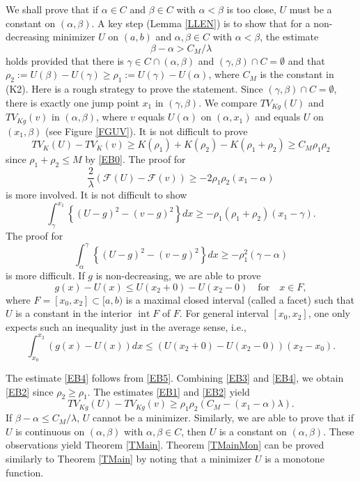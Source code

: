 \documentclass[11pt]{amsart} %
\numberwithin{equation}{section}
\begin{document}
We shall prove that if $\alpha\in C$ and $\beta\in C$ with $\alpha<\beta$ is too close, $U$ must be a constant on $(\alpha,\beta)$.
 A key step (Lemma \ref{LLEN}) is to show that for a non-decreasing minimizer $U$ on $(a,b)$ and $\alpha,\beta\in C$ with $\alpha<\beta$, the estimate
\[
	\beta - \alpha > C_M/\lambda
\]
holds provided that there is $\gamma\in C\cap(\alpha,\beta)$ and $(\gamma,\beta)\cap C=\emptyset$ and that $\rho_2:=U(\beta)-U(\gamma)\geq\rho_1:= U(\gamma)-U(\alpha)$, where $C_M$ is the constant in (K2).
 Here is a rough strategy to prove the statement.
 Since $(\gamma,\beta)\cap C=\emptyset$, there is exactly one  jump point $x_1$ in $(\gamma,\beta)$.
 We compare $TV_{Kg}(U)$ and $TV_{Kg}(v)$ in $(\alpha,\beta)$, where $v$ equals $U(\alpha)$ on $(\alpha,x_1)$ and equals $U$ on $(x_1,\beta)$ (see Figure \ref{FGUV}).
 It is not difficult to prove
\begin{equation} \label{EB1}
	TV_K(U) - TV_K(v) \geq K(\rho_1) + K(\rho_2) - K(\rho_1+\rho_2)
	\geq C_M \rho_1 \rho_2
\end{equation}
since $\rho_1+\rho_2\leq M$ by \eqref{EB0}.
 The proof for 
\begin{equation} \label{EB2}
	\frac2\lambda \left(\mathcal{F}(U) - \mathcal{F}(v) \right)
	\geq - 2\rho_1 \rho_2 (x_1-\alpha)
\end{equation}
is more involved.
 It is not difficult to show
\begin{equation} \label{EB3}
	\int_\gamma^{x_1} \left\{ (U-g)^2 - (v-g)^2 \right\} dx
	\geq - \rho_1(\rho_1+\rho_2)(x_1-\gamma).
\end{equation}
The proof for
\begin{equation} \label{EB4}
	\int_\alpha^\gamma \left\{ (U-g)^2 - (v-g)^2 \right\} dx
	\geq - \rho_1^2(\gamma-\alpha)
\end{equation}
is more difficult.
 If $g$ is non-decreasing, we are able to prove
\[
	g(x) - U(x) \leq U(x_2+0) - U(x_2-0)
	\quad\text{for}\quad  x \in F,
\]
where $F=[x_0,x_2]\subset[a,b)$ is a maximal closed interval (called a facet) such that $U$ is a constant in the interior $\operatorname{int}F$ of $F$.
 For general interval $[x_0,x_2]$, one only expects such an inequality just in the average sense, i.e.,
\begin{equation} \label{EB5}
	\int_{x_0}^{x_2} \left( g(x) - U(x) \right) dx
	\leq \left( U(x_2+0) - U(x_2-0) \right) (x_2-x_0).
\end{equation}

The estimate \eqref{EB4} 
follows from \eqref{EB5}.
 Combining \eqref{EB3} and \eqref{EB4}, we obtain \eqref{EB2} since $\rho_2\geq\rho_1$.
 The estimates \eqref{EB1} and \eqref{EB2} yield
\[
	TV_{Kg}(U) - TV_{Kg}(v) \geq \rho_1 \rho_2 \left(C_M - (x_1-\alpha)\lambda \right).
\]
If $\beta-\alpha\le C_M/\lambda$, $U$ cannot be a minimizer.
 Similarly, we are able to prove that if $U$ is continuous on $(\alpha,\beta)$ with $\alpha,\beta\in C$, then $U$ is a constant on $(\alpha,\beta)$.
 These observations yield Theorem \ref{TMain}.
 Theorem \ref{TMainMon} can be proved similarly to Theorem \ref{TMain} by noting that a minimizer $U$ is a monotone function.
\end{document}
